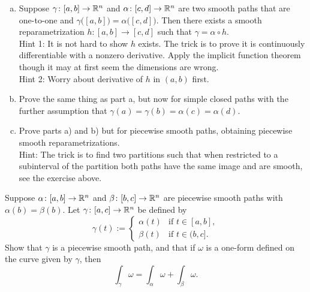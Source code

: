 \begin{exercise}
\leavevmode
\begin{enumerate}[a)]
\item
Suppose $\gamma \colon [a,b] \to {\mathbb{R}}^n$ and $\alpha \colon [c,d] \to {\mathbb{R}}^n$
are two smooth paths that are one-to-one and
$\gamma\bigl([a,b]\bigr) = \alpha\bigl([c,d]\bigr)$.  Then
there exists a smooth reparametrization $h \colon [a,b] \to [c,d]$
such that $\gamma = \alpha \circ h$.\\
Hint 1: It is not hard to show $h$ exists.
The trick is to prove it is continuously differentiable
with a nonzero derivative.  Apply the implicit function
theorem though it may at first seem the dimensions are wrong.\\
Hint 2: Worry about derivative of $h$ in $(a,b)$ first.
\item
Prove the same thing as part a, but now for simple closed paths with the
further assumption that $\gamma(a) = \gamma(b) = \alpha(c) = \alpha(d)$.
\item
Prove parts a) and b) but for piecewise smooth paths, obtaining
piecewise smooth reparametrizations.\\
Hint: The trick is to find two
partitions such that when restricted to a subinterval of the partition
both paths have the same image and are smooth, see the exercise above.
\end{enumerate}
\end{exercise}

\begin{exercise} 
\pagebreak[1]
Suppose $\alpha \colon [a,b] \to {\mathbb{R}}^n$ and
$\beta \colon [b,c] \to {\mathbb{R}}^n$ are piecewise smooth paths with
$\alpha(b)=\beta(b)$.  Let $\gamma \colon [a,c] \to {\mathbb{R}}^n$ be defined by
\begin{equation*}
\gamma(t) :=
\begin{cases}
\alpha(t) & \text{if } t \in [a,b], \\
\beta(t)  & \text{if } t \in (b,c].
\end{cases}
\end{equation*}
Show that $\gamma$ is a piecewise smooth path, and that if $\omega$ is a
one-form defined on the curve given by $\gamma$, then
\begin{equation*}
\int_{\gamma} \omega =
\int_{\alpha} \omega +
\int_{\beta} \omega .
\end{equation*}
\end{exercise}

